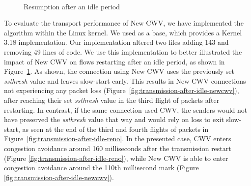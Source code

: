\documentclass[10pt,sigconf]{acmart}
\begin{document}
\begin{figure}[t!]
  \centering
  \\
    \caption{Resumption after an idle period}
    \label{fig:transmission-after-idle}
\end{figure}

To evaluate the transport performance of New CWV, we have implemented the algorithm within the Linux kernel. We used \cite{online-newcwv-base} as a base, which provides a Kernel 3.18 implementation. Our implementation altered two files adding 143 and removing 49 lines of code. We use this implementation to better illustrated the impact of New CWV on flows restarting after an idle period, as shown in Figure~\ref{fig:transmission-after-idle}.
As shown, the connection using New CWV uses the previously set \emph{ssthresh} value and leaves slow-start early. This results in New CWV connections not experiencing any packet loss (Figure~\ref{fig:transmission-after-idle-newcwv}), after reaching their set \emph{ssthresh} value in the third flight of packets after restarting. In contrast, if the same connection used CWV, the senders would not have preserved the \emph{ssthresh} value that way and would rely on loss to exit slow-start, as seen at the end of the third and fourth flights of packets in Figure~\ref{fig:transmission-after-idle-reno}. In the presented case, CWV enters congestion avoidance around 160 milliseconds after the transmission restart (Figure \ref{fig:transmission-after-idle-reno}), while New CWV is able to enter congestion avoidance around the 110th millisecond mark (Figure \ref{fig:transmission-after-idle-newcwv}).
\end{document}
